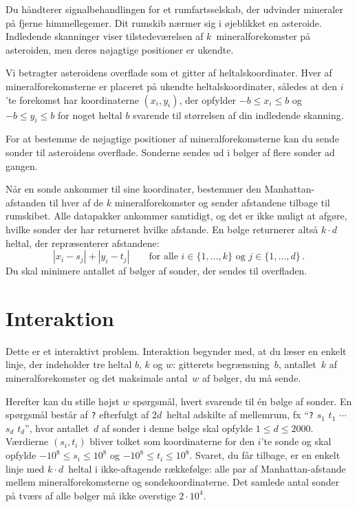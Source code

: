 

\noindent
Du håndterer signalbehandlingen for et rumfartsselskab,
der udvinder mineraler på fjerne himmellegemer.
Dit rumskib nærmer sig i øjeblikket en asteroide.
Indledende skanninger viser tilstedeværelsen af $k$~mineralforekomster på asteroiden, men deres nøjagtige positioner er ukendte.

\medskip

Vi betragter asteroidens overflade som et gitter af heltalskoordinater.
Hver af mineralforekomsterne er placeret på ukendte heltalskoordinater, 
således at den $i$'te forekomst har koordinaterne $(x_i, y_i)$, der opfylder
$-b \le x_i \le b$ og $-b\le y_i \le b$ %
for noget heltal $b$ svarende til størrelsen af din indledende skanning.

For at bestemme de nøjagtige positioner af mineralforekomsterne kan du sende sonder til asteroidens overflade. 
Sonderne sendes ud i bølger af flere sonder ad gangen.

Når en sonde ankommer til sine koordinater, bestemmer den Manhattan-afstanden til hver af de $k$ mineralforekomster og sender afstandene tilbage til rumskibet.
Alle datapakker ankommer samtidigt, og det er ikke muligt at afgøre, hvilke sonder der har returneret hvilke afstande. 
En bølge returnerer altså $k\cdot d$ heltal, der repræsenterer afstandene:
\[
|x_i-s_j| + |y_i - t_j| \qquad\text{for alle } i \in \{1,\ldots,k\} \text{ og } j \in\{ 1,\ldots,d\}\,.
\]
Du skal minimere antallet af bølger af sonder, der sendes til overfladen.

\section*{Interaktion}

Dette er et interaktivt problem.
Interaktion begynder med, at du læser en enkelt linje, der indeholder tre heltal $b$, $k$ og $w$:
gitterets begrænsning~$b$,
antallet~$k$ af mineralforekomster og
det maksimale antal~$w$ af bølger, du må sende.

Herefter kan du stille højst $w$ spørgsmål, hvert svarende til én bølge af sonder.
En spørgsmål består af \texttt{?} efterfulgt af $2d$~heltal adskilte af mellemrum, fx ``\texttt{?} $s_1$ $t_1$ $\cdots$ $s_d$ $t_d$'', hvor antallet~$d$ af sonder i denne bølge skal opfylde
$1\leq d\leq 2000$. %
Værdierne $(s_i,t_i)$ bliver tolket som koordinaterne for den $i$'te sonde og skal opfylde 
$-10^8 \leq s_i \leq 10^8$ og $-10^8 \leq t_i \leq 10^8$. %
Svaret, du får tilbage, er en enkelt linje med $k \cdot d$~heltal i ikke-aftagende rækkefølge:
alle par af Manhattan-afstande mellem mineralforekomsterne og sondekoordinaterne.
Det samlede antal sonder på tværs af alle bølger må ikke overstige
$2\cdot 10^4$. %

